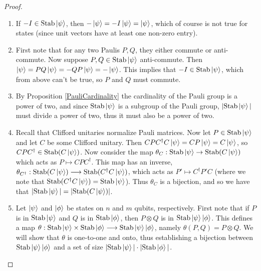 \documentclass[12pt]{dalthesis}
\begin{document}
\begin{proof}
\hspace{20mm}
\begin{enumerate}
\item If $-I \in \text{Stab}\ket{\psi}$, then $-\ket{\psi} =-I\ket{\psi} = \ket{\psi}$, which of course is not true for states (since unit vectors have at least one non-zero entry).

\item First note that for any two Paulis $P, Q$, they either commute or anti-commute. Now suppose $P, Q \in \text{Stab}\ket{\psi}$ anti-commute. Then $\ket{\psi} = PQ\ket{\psi} = -QP\ket{\psi} = -\ket{\psi}$. This implies that $-I \in \text{Stab}\ket{\psi}$, which from above can't be true, so $P$ and $Q$ must commute.

\item By Proposition \ref{PauliCardinality} the cardinality of the Pauli group is a power of two, and since $\text{Stab}\ket{\psi}$ is a subgroup of the Pauli group, $|\text{Stab}\ket{\psi}|$ must divide a power of two, thus it must also be a power of two.

\item Recall that Clifford unitaries normalize Pauli matrices. Now let $P \in \text{Stab}\ket{\psi}$ and let $C$ be some Clifford unitary. Then $CPC^{\dag}C\ket{\psi} = CP\ket{\psi} = C\ket{\psi}$, so $CPC^{\dag} \in \text{Stab}(C\ket{\psi})$. Now consider the map $\theta_C : \text{Stab}\ket{\psi} \rightarrow \text{Stab}(C\ket{\psi})$ which acts as $P \mapsto CPC^{\dag}$. This map has an inverse, $\theta_{C^\dag}: \text{Stab}(C\ket{\psi}) \longrightarrow \text{Stab}(C^{\dag}C\ket{\psi})$, which acts as $P' \mapsto C^{\dag}P'C$ (where we note that $\text{Stab}(C^{\dag}C\ket{\psi}) = \text{Stab}\ket{\psi}$). Thus $\theta_C$ is a bijection, and so we have that $|\text{Stab}\ket{\psi}| = |\text{Stab}(C\ket{\psi})|$.

\item Let $\ket{\psi}$ and $\ket{\phi}$ be states on $n$ and $m$ qubits, respectively. First note that if $P$ is in $\mathrm{Stab} \ket{\psi}$ and $Q$ is in $\mathrm{Stab} \ket{\phi}$, then $P\otimes Q$ is in $\mathrm{Stab} \ket{\psi} \ket{\phi}$. This defines a map $\theta: \mathrm{Stab} \ket{\psi} \times \mathrm{Stab} \ket{\phi} \longrightarrow \mathrm{Stab} \ket{\psi} \ket{\phi}$, namely $\theta (P, Q) = P \otimes Q$. We will show that $\theta$ is one-to-one and onto, thus establishing a bijection between $\mathrm{Stab} \ket{\psi} \ket{\phi}$ and a set of size $|\mathrm{Stab} \ket{\psi}| \cdot |\mathrm{Stab} \ket{\phi}|$. 


\end{enumerate}
\end{proof}
\end{document}
